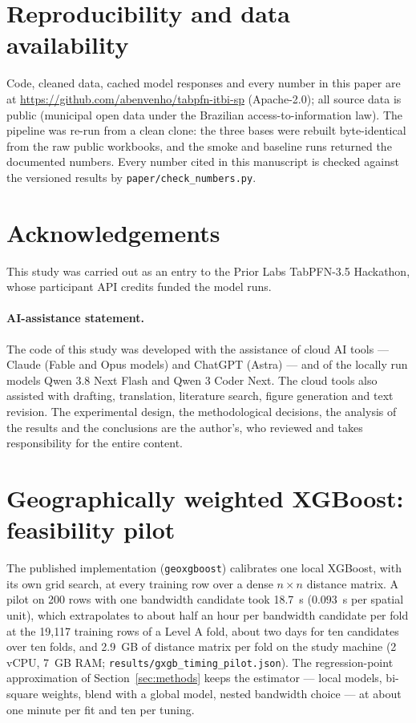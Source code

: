 \documentclass[11pt,a4paper]{article}
\begin{document}
\section*{Reproducibility and data availability}
Code, cleaned data, cached model responses and every number in this paper are at
\url{https://github.com/abenvenho/tabpfn-itbi-sp} (Apache-2.0); all source data is public
(municipal open data under the Brazilian access-to-information law). The pipeline was re-run
from a clean clone: the three bases were rebuilt byte-identical from the raw public workbooks,
and the smoke and baseline runs returned the documented numbers. Every number cited in this
manuscript is checked against the versioned results by \texttt{paper/check\_numbers.py}.

\section*{Acknowledgements}
This study was carried out as an entry to the Prior Labs TabPFN-3.5 Hackathon, whose
participant API credits funded the model runs.

\paragraph{AI-assistance statement.} The code of this study was developed with the assistance
of cloud AI tools --- Claude (Fable and Opus models) and ChatGPT (Astra) --- and of the locally
run models Qwen 3.8 Next Flash and Qwen 3 Coder Next. The cloud tools also assisted with
drafting, translation, literature search, figure generation and text revision. The experimental
design, the methodological decisions, the analysis of the results and the conclusions are the
author's, who reviewed and takes responsibility for the entire content.




\appendix

\section{Geographically weighted XGBoost: feasibility pilot}
\label{app:gxgb}

The published implementation (\texttt{geoxgboost}) calibrates one local XGBoost, with its own
grid search, at every training row over a dense $n \times n$ distance matrix. A pilot on 200
rows with one bandwidth candidate took 18.7~s ($0.093$~s per spatial unit), which extrapolates
to about half an hour per bandwidth candidate per fold at the 19{,}117 training rows of a
Level A fold, about two days for ten candidates over ten folds, and 2.9~GB of distance matrix
per fold on the study machine (2 vCPU, 7~GB RAM;
\texttt{results/gxgb\_timing\_pilot.json}). The regression-point approximation of
Section~\ref{sec:methods} keeps the estimator --- local models, bi-square weights, blend with a
global model, nested bandwidth choice --- at about one minute per fit and ten per tuning.
\end{document}
